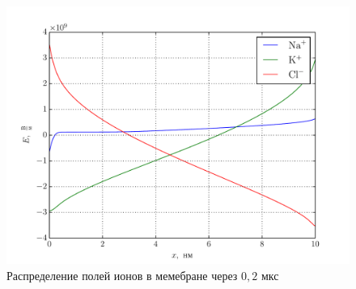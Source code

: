 \documentclass{hedwork}
\begin{document}
\begin{figure}[h]
\begin{center}
    \includegraphics[width=\textwidth]{plots/stat_field}
\end{center}
\caption{Распределение полей ионов в мемебране через \( 0,\!2 \) мкс}
\end{figure}
\end{document}

